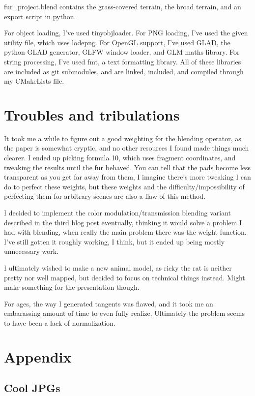 \documentclass[a4paper, 12pt]{article}
\begin{document}
    fur\_project.blend contains the grass-covered terrain, the broad terrain,
    and an export script in python.

    For object loading, I've used tinyobjloader.
    For PNG loading, I've used the given utility file, which uses lodepng.
    For OpenGL support, I've used GLAD, the python GLAD generator, GLFW window loader, and GLM maths library.
    For string processing, I've used fmt, a text formatting library.
    All of these libraries are included as git submodules, and are linked, included, and compiled through my CMakeLists file.

    \section{Troubles and tribulations}
    It took me a while to figure out a good weighting for the blending operator,
    as the paper is somewhat cryptic,
    and no other resources I found made things much clearer.
    I ended up picking formula 10, which uses fragment coordinates,
    and tweaking the results until the fur behaved.
    You can tell that the pads become less transparent as you get far away from them,
    I imagine there's more tweaking I can do to perfect these weights,
    but these weights and the difficulty/impossibility of perfecting them for arbitrary scenes
    are also a flaw of this method.

    I decided to implement the color modulation/transmission blending variant described in the third blog post eventually,
    thinking it would solve a problem I had with blending,
    when really the main problem there was the weight function.
    I've still gotten it roughly working, I think, but it ended up being mostly unnecessary work.

    I ultimately wished to make a new animal model,
    as ricky the rat is neither pretty nor well mapped,
    but decided to focus on technical things instead.
    Might make something for the presentation though.

    For ages, the way I generated tangents was flawed,
    and it took me an embarassing amount of time to even fully realize.
    Ultimately the problem seems to have been a lack of normalization.

    \newpage
    \section*{Appendix}

    \subsection*{Cool JPGs}
\end{document}
